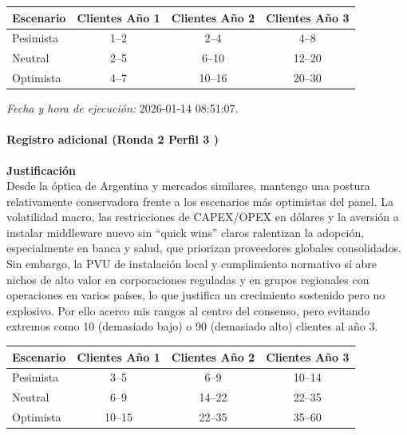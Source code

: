 \begin{center}
\footnotesize
\begin{tabular}{|l|c|c|c|}
\hline
\textbf{Escenario} & \textbf{Clientes Año 1} & \textbf{Clientes Año 2} & \textbf{Clientes Año 3} \\
\hline
Pesimista & 1--2 & 2--4 & 4--8 \\
\hline
Neutral & 2--5 & 6--10 & 12--20 \\
\hline
Optimista & 4--7 & 10--16 & 20--30 \\
\hline
\end{tabular}
\end{center}

\textit{Fecha y hora de ejecución:} 2026-01-14 08:51:07.

\paragraph{Registro adicional (Ronda 2 Perfil 3 )}

\textbf{Justificación  }\\
Desde la óptica de Argentina y mercados similares, mantengo una postura relativamente conservadora frente a los escenarios más optimistas del panel. La volatilidad macro, las restricciones de CAPEX/OPEX en dólares y la aversión a instalar middleware nuevo sin ``quick wins'' claros ralentizan la adopción, especialmente en banca y salud, que priorizan proveedores globales consolidados. Sin embargo, la PVU de instalación local y cumplimiento normativo sí abre nichos de alto valor en corporaciones reguladas y en grupos regionales con operaciones en varios países, lo que justifica un crecimiento sostenido pero no explosivo. Por ello acerco mis rangos al centro del consenso, pero evitando extremos como 10 (demasiado bajo) o 90 (demasiado alto) clientes al año 3.

\begin{center}
\footnotesize
\begin{tabular}{|l|c|c|c|}
\hline
\textbf{Escenario} & \textbf{Clientes Año 1} & \textbf{Clientes Año 2} & \textbf{Clientes Año 3} \\
\hline
Pesimista & 3--5 & 6--9 & 10--14 \\
\hline
Neutral & 6--9 & 14--22 & 22--35 \\
\hline
Optimista & 10--15 & 22--35 & 35--60 \\
\hline
\end{tabular}
\end{center}

